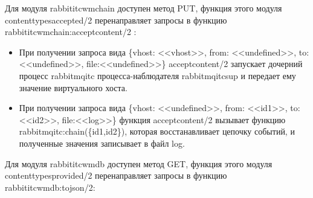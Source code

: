 {Для модуля  rabbit\underline{\hspace{0.25cm}}itc\underline{\hspace{0.25cm}}wm\underline{\hspace{0.25cm}}chain доступен метод PUT, функция этого модуля content\underline{\hspace{0.25cm}}types\underline{\hspace{0.25cm}}accepted/2 перенаправляет запросы в функцию  rabbit\underline{\hspace{0.25cm}}itc\underline{\hspace{0.25cm}}wm\underline{\hspace{0.25cm}}chain:accept\underline{\hspace{0.25cm}}content/2 :
\begin{itemize}
\item  При получении запроса вида \{vhost: <<vhost>>, from: <<undefined>>, to:<<undefined>>, file:<<undefined>>\} accept\underline{\hspace{0.25cm}}content/2 запускает дочерний процесс rabbitmq\underline{\hspace{0.25cm}}itc процесса-наблюдателя rabbitmq\underline{\hspace{0.25cm}}itc\underline{\hspace{0.25cm}}sup и передает ему значение виртуального хоста.
\item  При получении запроса вида \{vhost: <<undefined>>, from: <<id\underline{\hspace{0.25cm}}1>>, to:<<id\underline{\hspace{0.25cm}}2>>, file:<<log>>\} функция accept\underline{\hspace{0.25cm}}content/2 вызывает функцию rabbitmq\underline{\hspace{0.25cm}}itc:chain(\{id\underline{\hspace{0.25cm}}1,id\underline{\hspace{0.25cm}}2\}), которая восстанавливает цепочку событий, и полученные значения записывает в файл log.
\end{itemize}
Для модуля  rabbit\underline{\hspace{0.25cm}}itc\underline{\hspace{0.25cm}}wm\underline{\hspace{0.25cm}}db доступен метод GET, функция этого модуля content\underline{\hspace{0.25cm}}types\underline{\hspace{0.25cm}}provided/2 перенаправляет запросы в функцию  rabbit\underline{\hspace{0.25cm}}itc\underline{\hspace{0.25cm}}wm\underline{\hspace{0.25cm}}db:to\underline{\hspace{0.25cm}}json/2:

}
